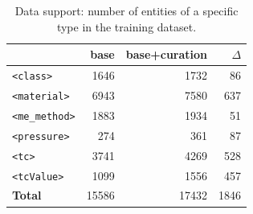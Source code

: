 \documentclass[a4paper]{article}
\begin{document}


\begin{table}[ht]
\centering
\caption{Data support: number of entities of a specific type in the training dataset.}
\begin{tabular}{lrrr}
\toprule
                        & \textbf{base}     & \textbf{base+curation}    & \textbf{$\Delta$}  \\ 
\midrule
\texttt{<class>}        & 1646              & 1732                      &  86                \\
\texttt{<material>}     & 6943              & 7580                      &  637               \\
\texttt{<me\_method>}   & 1883              & 1934                      &  51                \\
\texttt{<pressure>}     & 274               & 361                       &  87                \\
\texttt{<tc>}           & 3741              & 4269                      &  528               \\
\texttt{<tcValue>}      & 1099              & 1556                      &  457               \\
\midrule
\textbf{Total}          & 15586             & 17432                     & 1846               \\ 
\bottomrule
\end{tabular}
\label{tab:training-support}
\end{table}
\end{document}
